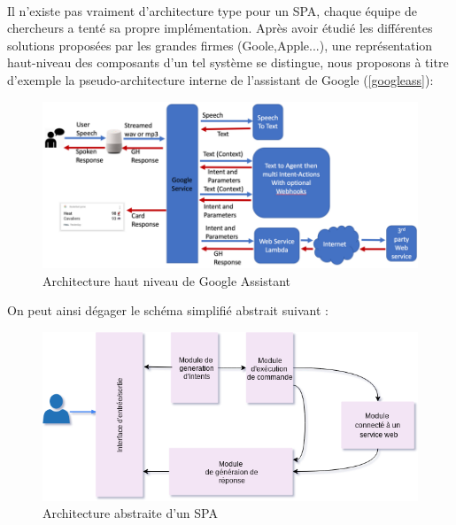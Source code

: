 \paragraph{}
Il n'existe pas vraiment d'architecture type pour un SPA, chaque équipe de chercheurs a tenté sa propre implémentation. Après avoir étudié les différentes solutions proposées par les grandes firmes (Goole,Apple...), une représentation haut-niveau des composants d'un tel système se distingue, nous proposons à titre d'exemple la pseudo-architecture interne de l'assistant de Google (\ref{googleass}): 
\begin{figure}[H]
	\centering
	\includegraphics[width=\linewidth]{images/SPA_architecture.png}
	\caption{Architecture haut niveau de Google Assistant \cite{GAlayout}}
\end{figure}
On peut ainsi dégager le schéma simplifié abstrait suivant : 
\begin{figure}[H]
	\centering
	\includegraphics[width=\linewidth]{images/SPA_diagram.png}
	\caption{Architecture abstraite d'un SPA}
\end{figure}


